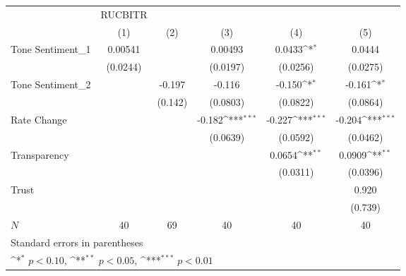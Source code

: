 {
\def\sym#1{\ifmmode^{#1}\else\(^{#1}\)\fi}
\begin{tabular}{l*{5}{c}}
\hline\hline
            &     RUCBITR         &                     &                     &                     &                     \\
            &\multicolumn{1}{c}{(1)}         &\multicolumn{1}{c}{(2)}         &\multicolumn{1}{c}{(3)}         &\multicolumn{1}{c}{(4)}         &\multicolumn{1}{c}{(5)}         \\
\hline
Tone Sentiment\_{1}&     0.00541         &                     &     0.00493         &      0.0433\sym{*}  &      0.0444         \\
            &    (0.0244)         &                     &    (0.0197)         &    (0.0256)         &    (0.0275)         \\
[1em]
Tone Sentiment\_{2}&                     &      -0.197         &      -0.116         &      -0.150\sym{*}  &      -0.161\sym{*}  \\
            &                     &     (0.142)         &    (0.0803)         &    (0.0822)         &    (0.0864)         \\
[1em]
Rate Change &                     &                     &      -0.182\sym{***}&      -0.227\sym{***}&      -0.204\sym{***}\\
            &                     &                     &    (0.0639)         &    (0.0592)         &    (0.0462)         \\
[1em]
Transparency&                     &                     &                     &      0.0654\sym{**} &      0.0909\sym{**} \\
            &                     &                     &                     &    (0.0311)         &    (0.0396)         \\
[1em]
Trust       &                     &                     &                     &                     &       0.920         \\
            &                     &                     &                     &                     &     (0.739)         \\
\hline
\(N\)       &          40         &          69         &          40         &          40         &          40         \\
\hline\hline
\multicolumn{6}{l}{\footnotesize Standard errors in parentheses}\\
\multicolumn{6}{l}{\footnotesize \sym{*} \(p<0.10\), \sym{**} \(p<0.05\), \sym{***} \(p<0.01\)}\\
\end{tabular}
}
